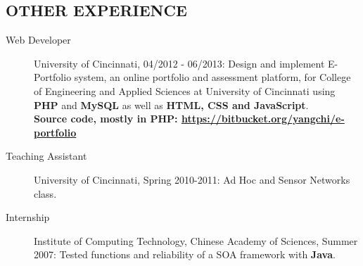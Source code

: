 \documentclass[line]{res}
\begin{document}
\begin{resume}
	\section{OTHER EXPERIENCE}
	\begin{description}
		\item[Web Developer] University of Cincinnati, 04/2012 - 06/2013: Design and implement E-Portfolio system, an online portfolio and assessment platform, for College of Engineering and Applied Sciences at University of Cincinnati using \textbf{PHP} and \textbf{MySQL} as well as \textbf{HTML, CSS and JavaScript}. \\
		\textbf{Source code, mostly in PHP: \url{https://bitbucket.org/yangchi/e-portfolio} }
		\item[Teaching Assistant] University of Cincinnati, Spring 2010-2011: Ad Hoc and Sensor Networks class.
		\item[Internship] Institute of Computing Technology, Chinese Academy of Sciences, Summer 2007: Tested functions and reliability of a SOA framework with \textbf{Java}.
	\end{description}

\end{resume}
\end{document}
